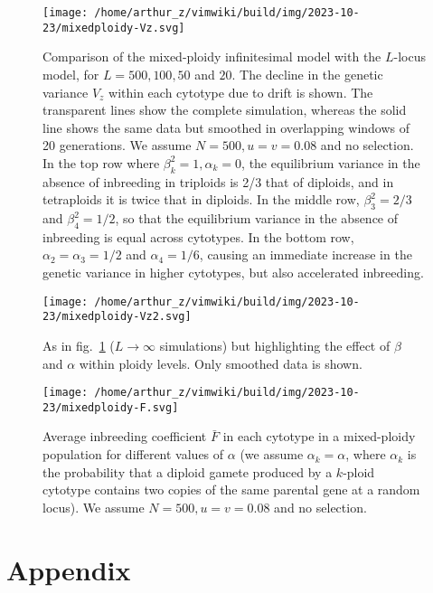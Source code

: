 \begin{figure}
\hypertarget{fig:vz}{%
\centering
\texttt{[image: /home/arthur\_z/vimwiki/build/img/2023-10-23/mixedploidy-Vz.svg]}
\caption{Comparison of the mixed-ploidy infinitesimal model with the
\(L\)-locus model, for \(L=500,100,50\) and \(20\). The decline in the
genetic variance \(V_z\) within each cytotype due to drift is shown. The
transparent lines show the complete simulation, whereas the solid line
shows the same data but smoothed in overlapping windows of 20
generations. We assume \(N=500, u=v=0.08\) and no selection. In the top
row where \(\beta_k^2=1, \alpha_k=0\), the equilibrium variance in the
absence of inbreeding in triploids is 2/3 that of diploids, and in
tetraploids it is twice that in diploids. In the middle row,
\(\beta_3^2=2/3\) and \(\beta_4^2=1/2\), so that the equilibrium
variance in the absence of inbreeding is equal across cytotypes. In the
bottom row, \(\alpha_2= \alpha_3 =1/2\) and \(\alpha_4=1/6\), causing an
immediate increase in the genetic variance in higher cytotypes, but also
accelerated inbreeding.}\label{fig:vz}
}
\end{figure}

\begin{figure}
\hypertarget{fig:vz2}{%
\centering
\texttt{[image: /home/arthur\_z/vimwiki/build/img/2023-10-23/mixedploidy-Vz2.svg]}
\caption{As in fig.~\ref{fig:vz} (\(L \rightarrow \infty\) simulations)
but highlighting the effect of \(\beta\) and \(\alpha\) within ploidy
levels. Only smoothed data is shown.}\label{fig:vz2}
}
\end{figure}

\begin{figure}
\hypertarget{fig:f1}{%
\centering
\texttt{[image: /home/arthur\_z/vimwiki/build/img/2023-10-23/mixedploidy-F.svg]}
\caption{Average inbreeding coefficient \(\bar{F}\) in each cytotype in
a mixed-ploidy population for different values of \(\alpha\) (we assume
\(\alpha_k=\alpha\), where \(\alpha_k\) is the probability that a
diploid gamete produced by a \(k\)-ploid cytotype contains two copies of
the same parental gene at a random locus). We assume \(N=500, u=v=0.08\)
and no selection.}\label{fig:f1}
}
\end{figure}

\clearpage

\hypertarget{appendix}{%
\section{Appendix}\label{appendix}}


